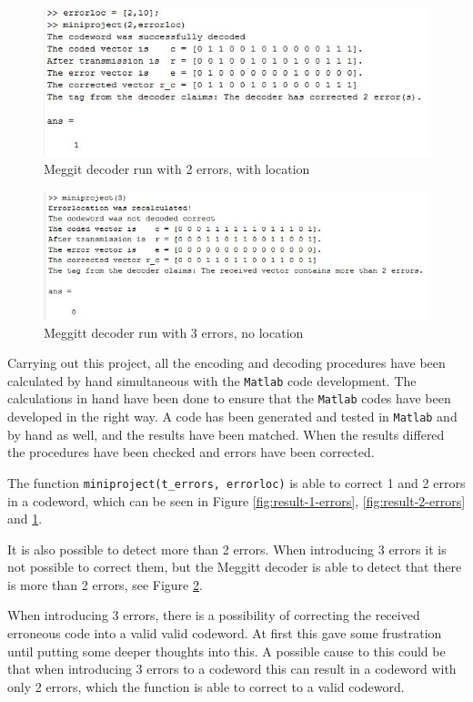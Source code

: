 \documentclass[Main]{subfiles}
\begin{document}
\begin{figure}[h!]
\centering
\includegraphics[width=0.7\linewidth]{./Picture/result-2-errors-location}
\caption{Meggit decoder run with 2 errors, with location}
\label{fig:result-2-errors-location}
\end{figure}

\begin{figure}[h!]
\centering
\includegraphics[width=0.7\linewidth]{./Picture/result-3-errors}
\caption{Meggitt decoder run with 3 errors, no location}
\label{fig:result-3-errors}
\end{figure}

Carrying out this project, all the encoding and decoding procedures have been calculated by hand simultaneous with the \texttt{Matlab} code development.
The calculations in hand have been done to ensure that the \texttt{Matlab} codes have been developed in the right way.
A code has been generated and tested in \texttt{Matlab} and by hand as well, and the results have been matched.
When the results differed the procedures have been checked and errors have been corrected.

The function \texttt{miniproject(t\_errors, errorloc)} is able to correct 1 and 2 errors in a codeword, which can be seen in Figure \ref{fig:result-1-errors}, \ref{fig:result-2-errors} and \ref{fig:result-2-errors-location}.

It is also possible to detect more than 2 errors.
When introducing 3 errors it is not possible to correct them, but the Meggitt decoder is able to detect that there is more than 2 errors, see Figure \ref{fig:result-3-errors}.

When introducing 3 errors, there is a possibility of correcting the received erroneous code into a valid valid codeword.
At first this gave some frustration until putting some deeper thoughts into this.
A possible cause to this could be that when introducing 3 errors to a codeword this can result in a codeword with only 2 errors, which the function is able to correct to a valid codeword.
\end{document}

